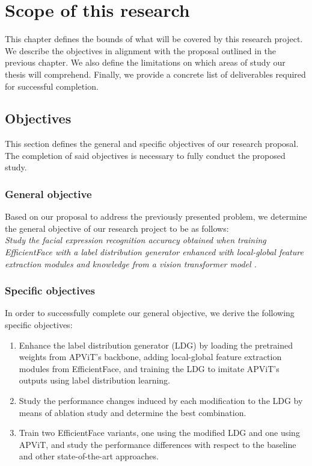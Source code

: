\documentclass[../main.tex]{subfiles}
\begin{document}
\chapter{Scope of this research}

This chapter defines the bounds of what will be covered by this research project.
We describe the objectives in alignment with the proposal outlined in the previous chapter.
We also define the limitations on which areas of study our thesis will comprehend.
Finally, we provide a concrete list of deliverables required for successful completion.
\newpage

\section{Objectives}

This section defines the general and specific objectives of our research proposal.
The completion of said objectives is necessary to fully conduct the proposed study.

\subsection{General objective}

Based on our proposal to address the previously presented problem, we determine the general objective of our research project to be as follows: \\

\textit{Study the facial expression recognition accuracy obtained when training EfficientFace \cite{eff-face2021} with a label distribution generator enhanced with local-global feature extraction modules and knowledge from a vision transformer model \cite{apvit2023}. }

\subsection{Specific objectives}

In order to successfully complete our general objective, we derive the following specific objectives:\\

\begin{enumerate}
    \item Enhance the label distribution generator (LDG) by loading the pretrained weights from APViT's backbone, adding local-global feature extraction modules from EfficientFace, and training the LDG to imitate APViT's outputs using label distribution learning.

    \item Study the performance changes induced by each modification to the LDG by means of ablation study and determine the best combination.
    
    \item Train two EfficientFace variants, one using the modified LDG and one using APViT, and study the performance differences with respect to the baseline and other state-of-the-art approaches.
    
\end{enumerate}
\end{document}

